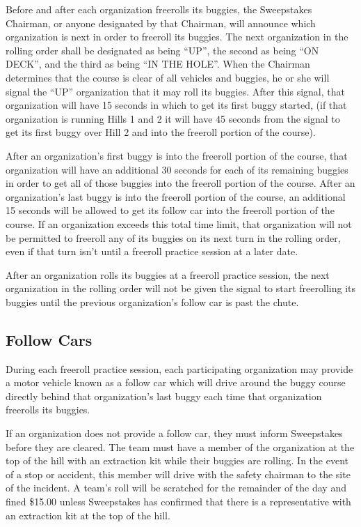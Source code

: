 	Before and after each organization freerolls its buggies, the Sweepstakes Chairman, or anyone designated by that Chairman, will announce which organization is next in order to freeroll its buggies. The next organization in the rolling order shall be designated as being “UP”, the second as being “ON DECK”, and the third as being “IN THE HOLE”. When the Chairman determines that the course is clear of all vehicles and buggies, he or she will signal the “UP” organization that it may roll its buggies. After this signal, that organization will have 15 seconds in which to get its first buggy started, (if that organization is running Hills 1 and 2 it will have 45 seconds from the signal to get its first buggy over Hill 2 and into the freeroll portion of the course).

	After an organization's first buggy is into the freeroll portion of the course, that organization will have an additional 30 seconds for each of its remaining buggies in order to get all of those buggies into the freeroll portion of the course. After an organization's last buggy is into the freeroll portion of the course, an additional 15 seconds will be allowed to get its follow car into the freeroll portion of the course. If an organization exceeds this total time limit, that organization will not be permitted to freeroll any of its buggies on its next turn in the rolling order, even if that turn isn't until a freeroll practice session at a later date.

	After an organization rolls its buggies at a freeroll practice session, the next organization in the rolling order will not be given the signal to start freerolling its buggies until the previous organization's follow car is past the chute.

\subsection{Follow Cars}
\label{subsec:Follow Cars}

	During each freeroll practice session, each participating organization may provide a motor vehicle known as a follow car which will drive around the buggy course directly behind that organization's last buggy each time that organization freerolls its buggies.

	If an organization does not provide a follow car, they must inform Sweepstakes before they are cleared. The team must have a member of the organization at the top of the hill with an extraction kit while their buggies are rolling. In the event of a stop or accident, this member will drive with the safety chairman to the site of the incident. A team's roll will be scratched for the remainder of the day and fined \$15.00 unless Sweepstakes has confirmed that there is a representative with an extraction kit at the top of the hill.

